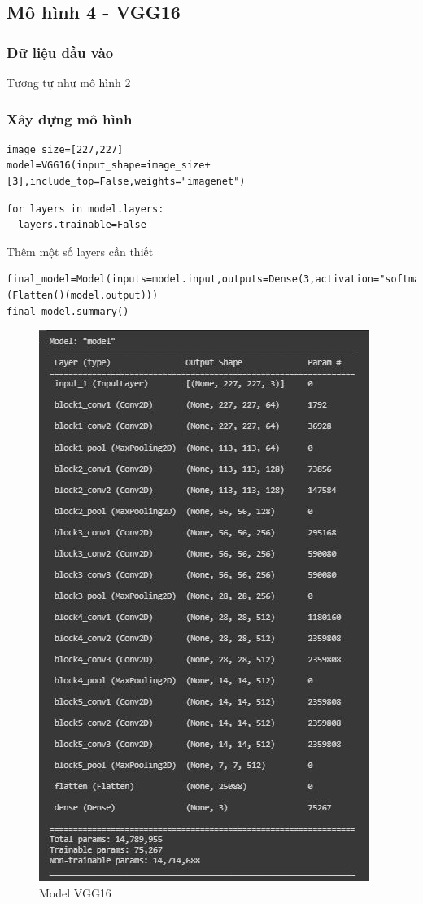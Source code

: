 \newpage
\subsection{Mô hình 4 - VGG16}
\subsubsection{Dữ liệu đầu vào}
Tương tự như mô hình 2
\subsubsection{Xây dựng mô hình}
\begin{lstlisting}
image_size=[227,227]
model=VGG16(input_shape=image_size+[3],include_top=False,weights="imagenet")
\end{lstlisting}
\begin{lstlisting}
for layers in model.layers:
  layers.trainable=False
\end{lstlisting}
Thêm một số layers cần thiết
\begin{lstlisting}
final_model=Model(inputs=model.input,outputs=Dense(3,activation="softmax")(Flatten()(model.output)))
final_model.summary()
\end{lstlisting}

\begin{center}
    \begin{figure}[!h]
        \centering
        \includegraphics[scale = 1]{fileanh/20.jpg}
        \caption{Model VGG16}
    \end{figure}
\end{center}

